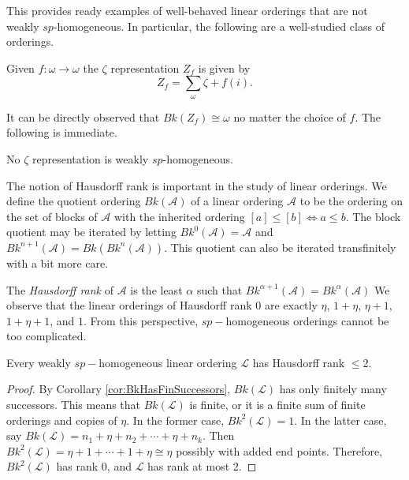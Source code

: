 \documentclass[11pt]{amsart}
\theoremstyle{definition}
\def\sA{\mathcal A}
\def\sL{\mathcal L}
\begin{document}
This provides ready examples of well-behaved linear orderings that are not weakly $sp$-homogeneous.
In particular, the following are a well-studied class of orderings.

\begin{definition}
    Given $f:\omega\to\omega$ the $\zeta$ representation $Z_f$ is given by
    \[Z_f=\sum_\omega\zeta+f(i).\]
\end{definition}

It can be directly observed that $Bk(Z_f)\cong\omega$ no matter the choice of $f$.
The following is immediate.

\begin{corollary} \label{wspcor} 
No $\zeta$ representation is weakly $sp$-homogeneous.
\end{corollary} 


The notion of Hausdorff rank is important in the study of linear orderings. 
We define the quotient ordering $Bk(\sA)$ of a linear ordering $\sA$  to be the ordering on the set of blocks of $\sA$ with the inherited ordering $[a] \leq [b] \iff a \leq b$.
The block quotient may be iterated by letting $Bk^0(\sA) = \sA$
and $Bk^{n+1}(\sA) = Bk(Bk^n(\sA))$.
This quotient can also be iterated transfinitely with a bit more care.

\smallskip

The \emph{Hausdorff rank} of $\sA$ is the least $\alpha$ such that $Bk^{\alpha+1}(\sA) = Bk^\alpha(\sA)$
We observe that the linear orderings of Hausdorff rank 0 are exactly $\eta$, $1+\eta$, $\eta+1$, $1+\eta +1$, and $1$.
From this perspective, $sp-$homogeneous orderings cannot be too complicated.

\begin{proposition} 
Every weakly $sp-$homogeneous linear ordering $\sL$ has Hausdorff rank $\leq 2$. 
\end{proposition}

\begin{proof} By Corollary \ref{cor:BkHasFinSuccessors}, $Bk(\sL)$ has only finitely many successors.
This means that $Bk(\sL)$ is finite, or it is a finite sum of finite orderings and copies of $\eta$.
In the former case, $Bk^2(\sL)=1$.
In the latter case, say $Bk(\sL)=n_1+\eta+n_2+\cdots+\eta+n_k$.
Then $Bk^2(\sL)= \eta+1+\cdots+1+\eta\cong\eta$ possibly with added end points.
Therefore, $Bk^2(\sL)$ has rank $0$, and $\sL$ has rank at most $2$.
\end{proof}
\end{document}
